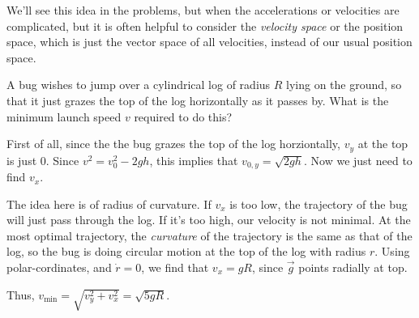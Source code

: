     We'll see this idea in the problems, but when the accelerations or velocities are complicated, but it is often helpful 
    to consider the \emph{velocity space} or the position space, which is just the vector space of all velocities, instead 
    of our usual position space.

    \begin{example}
        A bug wishes to jump over a cylindrical log of radius $R$ lying on the ground, so that it just
        grazes the top of the log horizontally as it passes by. What is the minimum launch speed $v$
        required to do this?

        \begin{soln}
            First of all, since the the bug grazes the top of the log horziontally, $v_y$ at the top is just 
            $0$. Since $v^2 = v_0^2 - 2gh$, this implies that $v_{0,y} = \sqrt{2gh}$. Now we just need to find $v_x$.
            
            The idea here is of radius of curvature. If $v_x$ is too low, the
            trajectory of the bug will just pass through the log. If it's too high, our velocity is not minimal. 
            At the most optimal trajectory, the \emph{curvature} of the trajectory is the same as that of the log, so
            the bug is doing circular motion at the top of the log with radius $r$. Using polar-cordinates, and $\dot{r} = 0$, we find that 
            $v_x = gR$, since $\vec{g}$ points radially at top.

            Thus, $v_{\text{min}} = \sqrt{v_y^2 + v_x^2} = \sqrt{5gR}$.
        \end{soln}
    \end{example}

    \newpage

